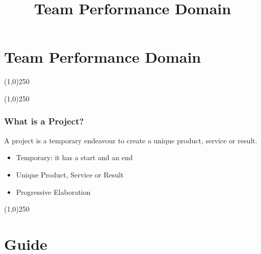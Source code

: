 



%
\title[Project Management \& BIM]{Team Performance Domain}



%
\usetikzlibrary{arrows}



\newpage




\thispagestyle{empty}
\tableofcontents
\newpage
\section{Team Performance Domain}


\begin{frame}
\titlepage
\end{frame}\begin{center}\line(1,0){250}\end{center}
%
%
\begin{center}\line(1,0){250}\end{center}



\begin{frame}
\frametitle{What is a Project?}
A project is a temporary endeavour to create a unique product, service or result.\\
\begin{itemize}
\item Temporary: it has a start and an end
\item Unique Product, Service or Result
\item Progressive Elaboration
\end{itemize}
\end{frame}
\begin{center}\line(1,0){250}\end{center}









\section{Guide}

